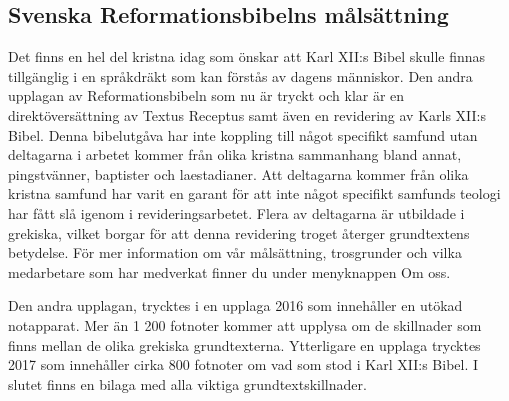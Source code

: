 \subsection*{Svenska Reformationsbibelns målsättning}

Det finns en hel del kristna idag som önskar att Karl XII:s Bibel skulle finnas tillgänglig i en språkdräkt som kan förstås av dagens människor. Den andra upplagan av Reformationsbibeln som nu är tryckt och klar är en direktöversättning av Textus Receptus samt även en revidering av Karls XII:s Bibel. Denna bibelutgåva har inte koppling till något specifikt samfund utan deltagarna i arbetet kommer från olika kristna sammanhang bland annat, pingstvänner, baptister och laestadianer. Att deltagarna kommer från olika kristna samfund har varit en garant för att inte något specifikt samfunds teologi har fått slå igenom i revideringsarbetet. Flera av deltagarna är utbildade i grekiska, vilket borgar för att denna revidering troget återger grundtextens betydelse. För mer information om vår målsättning, trosgrunder och vilka medarbetare som har medverkat finner du under menyknappen Om oss.

Den andra upplagan, trycktes i en upplaga 2016 som innehåller en utökad notapparat. Mer än 1 200 fotnoter kommer att upplysa om de skillnader som finns mellan de olika grekiska grundtexterna. Ytterligare en upplaga trycktes 2017 som innehåller cirka 800 fotnoter om vad som stod i Karl XII:s Bibel. I slutet finns en bilaga med alla viktiga grundtextskillnader.

\newpage